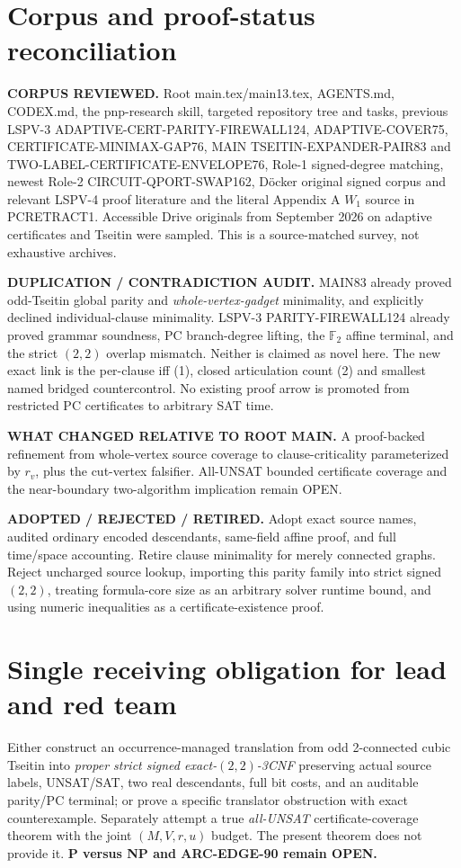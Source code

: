 \documentclass[11pt]{article}
\begin{document}
\section{Corpus and proof-status reconciliation}
\textbf{CORPUS REVIEWED.}
Root main.tex/main13.tex, AGENTS.md, CODEX.md, the
pnp-research skill, targeted repository tree and tasks,
previous LSPV-3 ADAPTIVE-CERT-PARITY-FIREWALL124,
ADAPTIVE-COVER75, CERTIFICATE-MINIMAX-GAP76,
MAIN TSEITIN-EXPANDER-PAIR83 and
TWO-LABEL-CERTIFICATE-ENVELOPE76, Role-1 signed-degree
matching, newest Role-2 CIRCUIT-QPORT-SWAP162,
D\"ocker original signed corpus and relevant
LSPV-4 proof literature and the literal Appendix A $W_1$ source in PCRETRACT1.
Accessible Drive originals from September 2026
on adaptive certificates and Tseitin were sampled.
This is a source-matched survey, not exhaustive archives.

\textbf{DUPLICATION / CONTRADICTION AUDIT.}
MAIN83 already proved odd-Tseitin global parity and
\emph{whole-vertex-gadget} minimality, and explicitly
declined individual-clause minimality.
LSPV-3 PARITY-FIREWALL124 already proved grammar soundness,
PC branch-degree lifting, the $\mathbb F_2$ affine terminal,
and the strict $(2,2)$ overlap mismatch.
Neither is claimed as novel here.
The new exact link is the per-clause iff (1), closed
articulation count (2) and smallest named bridged
countercontrol. No existing proof arrow is promoted
from restricted PC certificates to arbitrary SAT time.

\textbf{WHAT CHANGED RELATIVE TO ROOT MAIN.}
A proof-backed refinement from whole-vertex source
coverage to clause-criticality parameterized by
$r_v$, plus the cut-vertex falsifier.
All-UNSAT bounded certificate coverage and the
near-boundary two-algorithm implication remain OPEN.

\textbf{ADOPTED / REJECTED / RETIRED.}
Adopt exact source names, audited ordinary encoded
descendants, same-field affine proof, and full
time/space accounting. Retire clause minimality
for merely connected graphs. Reject uncharged
source lookup, importing this parity family into
strict signed $(2,2)$, treating formula-core size
as an arbitrary solver runtime bound, and using
numeric inequalities as a certificate-existence proof.

\section{Single receiving obligation for lead and red team}
Either construct an occurrence-managed translation from
odd 2-connected cubic Tseitin into \emph{proper strict
signed exact-$(2,2)$-3CNF} preserving actual source labels,
UNSAT/SAT, two real descendants, full bit costs,
and an auditable parity/PC terminal; or prove a
specific translator obstruction with exact counterexample.
Separately attempt a true \emph{all-UNSAT}
certificate-coverage theorem with the joint
$(M,V,r,u)$ budget. The present theorem does not
provide it. \textbf{P versus NP and ARC-EDGE-90 remain OPEN.}
\end{document}
